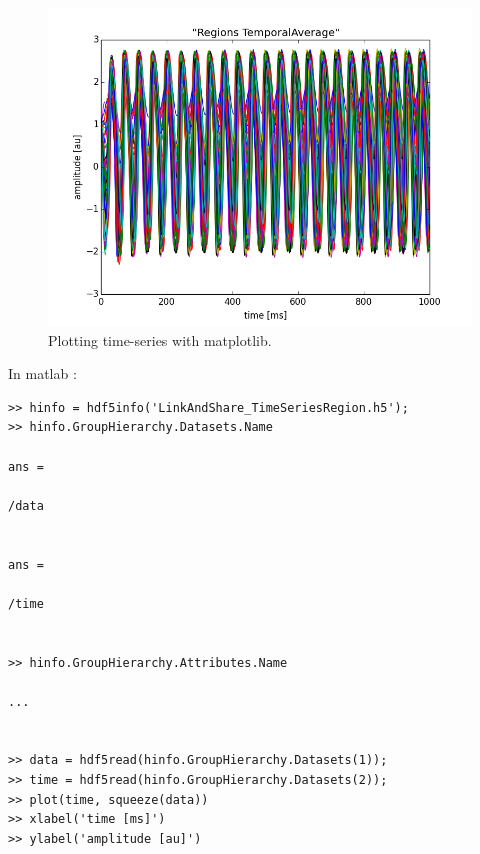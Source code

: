 \documentclass{tufte-handout}
\begin{document}
\begin{figure}[h]
  \includegraphics[width=\linewidth]{Handout_UI_LinkAndShare_IpythonTimeSeriesRegion.png}%
  \caption{Plotting time-series with matplotlib.}%
  \label{fig:ipython}%
\end{figure}

In matlab :

\begin{verbatim}
>> hinfo = hdf5info('LinkAndShare_TimeSeriesRegion.h5');
>> hinfo.GroupHierarchy.Datasets.Name

ans =

/data


ans =

/time


>> hinfo.GroupHierarchy.Attributes.Name

...


>> data = hdf5read(hinfo.GroupHierarchy.Datasets(1));
>> time = hdf5read(hinfo.GroupHierarchy.Datasets(2));
>> plot(time, squeeze(data))
>> xlabel('time [ms]')	
>> ylabel('amplitude [au]')

\end{verbatim}
\end{document}
